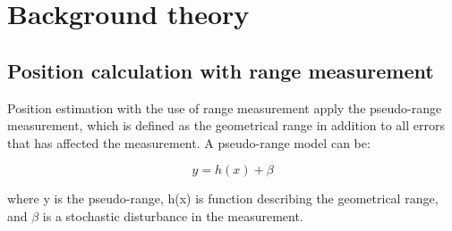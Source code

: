 \chapter{Background theory}
\section{Position calculation with range measurement}

Position estimation with the use of range measurement apply the pseudo-range measurement, which is defined as the geometrical range in addition to all errors that has affected the measurement. A pseudo-range model can be:

\begin{equation}
y = h(x) + \beta
\end{equation}

where y is the pseudo-range, h(x) is function describing the geometrical range, and $\beta$ is a stochastic disturbance in the measurement.